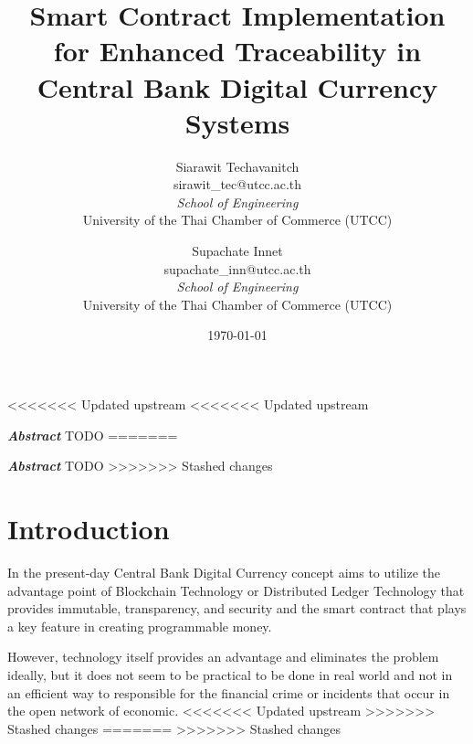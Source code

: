 \documentclass[letterpaper,twocolumn,10pt]{article} %
\title{\textbf{Smart Contract Implementation for Enhanced Traceability in Central Bank Digital Currency Systems}} %
\author{
    Siarawit Techavanitch \\ sirawit\_tec@utcc.ac.th \\ \textit{School of Engineering} \\ University of the Thai Chamber of Commerce (UTCC) \and
    Supachate Innet \\ supachate\_inn@utcc.ac.th \\ \textit{School of Engineering} \\ University of the Thai Chamber of Commerce (UTCC) } %
\date{\today} %
\begin{document}
<<<<<<< Updated upstream
<<<<<<< Updated upstream
    \maketitle %
    
    \textbf{\textit{Abstract}} TODO 
=======
\maketitle %


\textbf{\textit{Abstract}} TODO
>>>>>>> Stashed changes
\section{Introduction} In the present-day
Central Bank Digital Currency
concept aims to utilize the advantage point of Blockchain Technology
or Distributed Ledger Technology that provides immutable,
transparency, and security and the smart contract that plays a key feature in creating programmable money.

However, technology itself provides an advantage and eliminates the problem ideally,
but it does not seem to be practical to be done in real world and not in an efficient way to responsible for the financial crime or incidents that occur in the open network of economic.
<<<<<<< Updated upstream
>>>>>>> Stashed changes
=======
>>>>>>> Stashed changes
\end{document}
